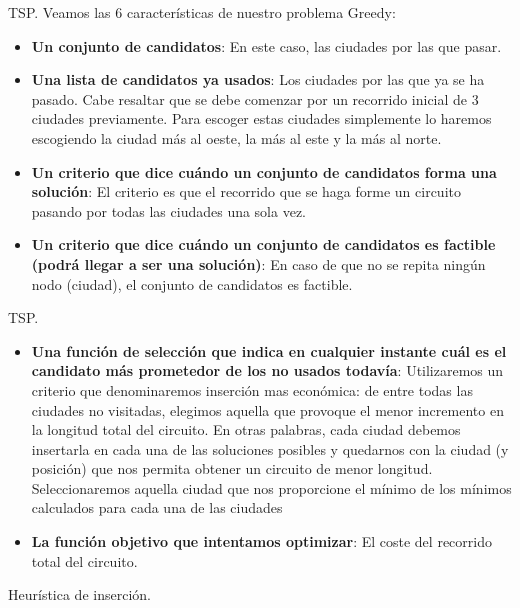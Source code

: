 \documentclass[10pt, xcolor=table]{beamer}
\begin{document}
\begin{frame}[fragile]{TSP. }
Veamos las 6 características de nuestro problema Greedy:
	\begin{itemize}
		\item \textbf{Un conjunto de candidatos}: En este caso, las ciudades por las que pasar.
		\item \textbf{Una lista de candidatos ya usados}: Los ciudades por las que ya se ha pasado. Cabe resaltar que se debe comenzar por un recorrido inicial de 3 ciudades previamente. Para escoger estas ciudades simplemente lo haremos escogiendo la ciudad más al oeste, la más al este y la más al norte.
		\item \textbf{Un criterio que dice cuándo un conjunto de candidatos forma una solución}: El criterio es que el recorrido que se haga forme un circuito pasando por todas las ciudades una sola vez.
		\item \textbf{Un criterio que dice cuándo un conjunto de candidatos es factible (podrá llegar a ser una solución)}: En caso de que no se repita ningún nodo (ciudad), el conjunto de candidatos es factible.
		\end{itemize}
		
\end{frame}
\begin{frame}[fragile]{TSP. }
	\begin{itemize}
	
		\item \textbf{Una función de selección que indica en cualquier instante cuál es el candidato más prometedor de los no usados todavía}: Utilizaremos un criterio que denominaremos inserción mas económica: de entre todas las ciudades no visitadas, elegimos aquella que provoque el menor incremento en la longitud total del circuito.
En otras palabras, cada ciudad debemos insertarla en cada una de las soluciones posibles y quedarnos con la ciudad (y posición) que nos permita obtener un circuito de menor longitud. Seleccionaremos aquella ciudad que nos proporcione el mínimo de los mínimos calculados para cada una de las ciudades
		\item \textbf{La función objetivo que intentamos optimizar}: El coste del recorrido total del circuito.
\end{itemize}
\end{frame}

\begin{frame}[fragile]{Heurística de inserción. }
\begin{center}
\scalebox{0.75}{

}
\end{center}
\end{frame}
\end{document}
